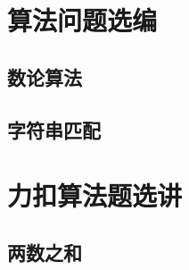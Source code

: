 \documentclass[oneside,10pt,fontset=none]{ctexbook}
\numberwithin{definition}{chapter}
\numberwithin{theorem}{chapter}
\numberwithin{proof}{chapter}
\begin{document}
\part{算法问题选编}

\chapter{数论算法}

\chapter{字符串匹配}

\part{力扣算法题选讲}

\chapter{两数之和}
\end{document}
